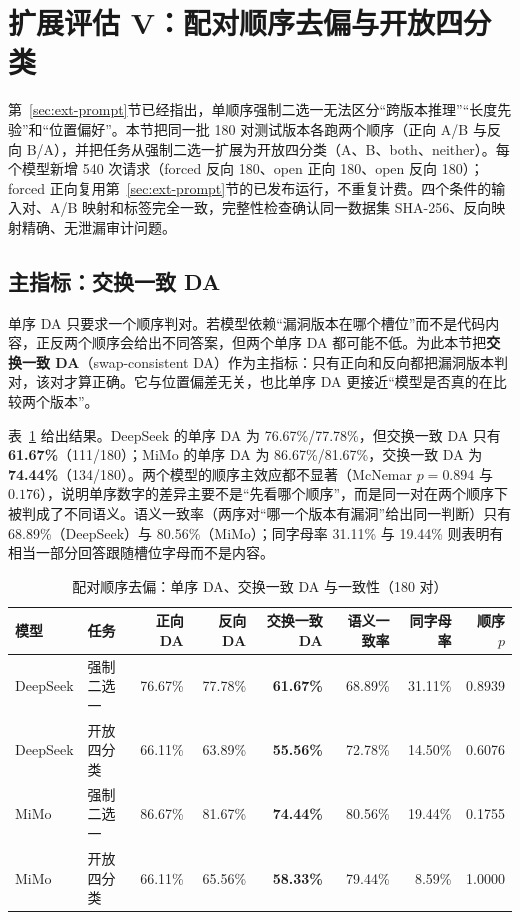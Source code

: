 \documentclass[conference]{IEEEtran}
\begin{document}
\section{扩展评估 V：配对顺序去偏与开放四分类}
\label{sec:pair-debias}

第~\ref{sec:ext-prompt}节已经指出，单顺序强制二选一无法区分“跨版本推理”“长度先验”和“位置偏好”。本节把同一批 180 对测试版本各跑两个顺序（正向 A/B 与反向 B/A），并把任务从强制二选一扩展为开放四分类（A、B、both、neither）。每个模型新增 540 次请求（forced 反向 180、open 正向 180、open 反向 180）；forced 正向复用第~\ref{sec:ext-prompt}节的已发布运行，不重复计费。四个条件的输入对、A/B 映射和标签完全一致，完整性检查确认同一数据集 SHA-256、反向映射精确、无泄漏审计问题。

\subsection{主指标：交换一致 DA}

单序 DA 只要求一个顺序判对。若模型依赖“漏洞版本在哪个槽位”而不是代码内容，正反两个顺序会给出不同答案，但两个单序 DA 都可能不低。为此本节把\textbf{交换一致 DA}（swap-consistent DA）作为主指标：只有正向和反向都把漏洞版本判对，该对才算正确。它与位置偏差无关，也比单序 DA 更接近“模型是否真的在比较两个版本”。

表~\ref{tab:pd-main} 给出结果。DeepSeek 的单序 DA 为 76.67\%/77.78\%，但交换一致 DA 只有 \textbf{61.67\%}（111/180）；MiMo 的单序 DA 为 86.67\%/81.67\%，交换一致 DA 为 \textbf{74.44\%}（134/180）。两个模型的顺序主效应都不显著（McNemar $p=0.894$ 与 $0.176$），说明单序数字的差异主要不是“先看哪个顺序”，而是同一对在两个顺序下被判成了不同语义。语义一致率（两序对“哪一个版本有漏洞”给出同一判断）只有 68.89\%（DeepSeek）与 80.56\%（MiMo）；同字母率 31.11\% 与 19.44\% 则表明有相当一部分回答跟随槽位字母而不是内容。

\begin{table}[t]
\caption{配对顺序去偏：单序 DA、交换一致 DA 与一致性（180 对）}
\label{tab:pd-main}
\centering
\scriptsize
\setlength{\tabcolsep}{3.2pt}
\begin{tabular}{@{}llrrrrrr@{}}
\toprule
模型 & 任务 & 正向 DA & 反向 DA & 交换一致 DA & 语义一致率 & 同字母率 & 顺序 $p$\\
\midrule
DeepSeek & 强制二选一 & 76.67\% & 77.78\% & \textbf{61.67\%} & 68.89\% & 31.11\% & 0.8939\\
DeepSeek & 开放四分类 & 66.11\% & 63.89\% & \textbf{55.56\%} & 72.78\% & 14.50\% & 0.6076\\
MiMo & 强制二选一 & 86.67\% & 81.67\% & \textbf{74.44\%} & 80.56\% & 19.44\% & 0.1755\\
MiMo & 开放四分类 & 66.11\% & 65.56\% & \textbf{58.33\%} & 79.44\% & 8.59\% & 1.0000\\
\bottomrule
\end{tabular}
\end{table}
\end{document}
